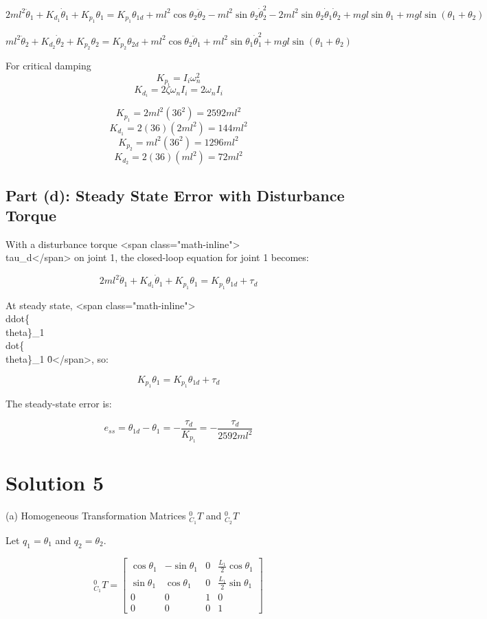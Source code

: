 \documentclass{article}
\begin{document}
\[
2ml^2 \ddot{\theta}_1 + K_{d_1} \dot{\theta}_1 + K_{p_1} \theta_1 = K_{p_1} \theta_{1d} + ml^2 \cos\theta_2 \ddot{\theta}_2 - ml^2 \sin\theta_2 \dot{\theta}_2^2 - 2ml^2 \sin\theta_2 \dot{\theta}_1 \dot{\theta}_2 + mgl\sin\theta_1 + mgl\sin(\theta_1 + \theta_2)
\]

\[
ml^2 \ddot{\theta}_2 + K_{d_2} \dot{\theta}_2 + K_{p_2} \theta_2 = K_{p_2} \theta_{2d} + ml^2 \cos\theta_2 \ddot{\theta}_1 + ml^2 \sin\theta_1 \dot{\theta}_1^2 + mgl\sin(\theta_1 + \theta_2)
\]

For critical damping 
\[
K_{p_i} = I_i \omega_n^2
\]
\[
K_{d_i} = 2 \zeta \omega_n I_i = 2 \omega_n I_i
\]

\[
K_{p_1} = 2ml^2 (36^2) = 2592 ml^2
\]
\[
K_{d_1} = 2 (36) (2ml^2) = 144 ml^2
\]
\[
K_{p_2} = ml^2 (36^2) = 1296 ml^2
\]
\[
K_{d_2} = 2 (36) (ml^2) = 72 ml^2
\]

\subsection*{Part (d): Steady State Error with Disturbance Torque}

With a disturbance torque <span class="math-inline">\\tau\_d</span> on joint 1, the closed-loop equation for joint 1 becomes:

\[
2ml^2 \ddot{\theta}_1 + K_{d_1} \dot{\theta}_1 + K_{p_1} \theta_1 = K_{p_1} \theta_{1d} + \tau_d
\]

At steady state, <span class="math-inline">\\ddot\{\\theta\}\_1 \= \\dot\{\\theta\}\_1 \= 0</span>, so:

\[
K_{p_1} \theta_1 = K_{p_1} \theta_{1d} + \tau_d
\]

The steady-state error is:

\[
e_{ss} = \theta_{1d} - \theta_1 = -\frac{\tau_d}{K_{p_1}} = -\frac{\tau_d}{2592 ml^2}
\]


\section*{Solution 5}

(a) Homogeneous Transformation Matrices ${}^{0}_{C_1}T$ and ${}^{0}_{C_2}T$

Let $q_1 = \theta_1$ and $q_2 = \theta_2$.

\[
{}^{0}_{C_1}T = \begin{bmatrix} \cos\theta_1 & -\sin\theta_1 & 0 & \frac{L_1}{2} \cos\theta_1 \\ \sin\theta_1 & \cos\theta_1 & 0 & \frac{L_1}{2} \sin\theta_1 \\ 0 & 0 & 1 & 0 \\ 0 & 0 & 0 & 1 \end{bmatrix}
\]
\end{document}
